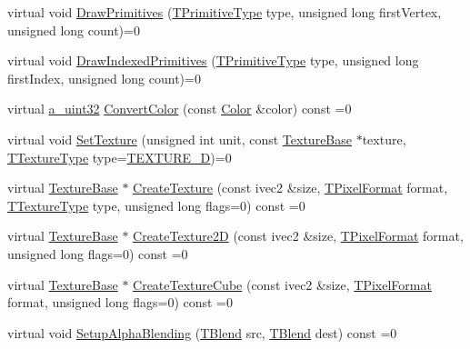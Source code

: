 \begin{DoxyCompactItemize}
virtual void \hyperlink{class_agmd_1_1_driver_a17c73e5ff37f4da7cb16b63f2d1ffa1c}{Draw\+Primitives} (\hyperlink{namespace_agmd_a0e38d0c34891ddd6eef72e1c9e55161c}{T\+Primitive\+Type} type, unsigned long first\+Vertex, unsigned long count)=0
\item 
virtual void \hyperlink{class_agmd_1_1_driver_a602d935335e7601b5fe2b74fe57d3547}{Draw\+Indexed\+Primitives} (\hyperlink{namespace_agmd_a0e38d0c34891ddd6eef72e1c9e55161c}{T\+Primitive\+Type} type, unsigned long first\+Index, unsigned long count)=0
\item 
virtual \hyperlink{_common_defines_8h_a964296f9770051b9e4807b1f180dd416}{a\+\_\+uint32} \hyperlink{class_agmd_1_1_driver_aa9090ef4c1fd4865a708cf990155c780}{Convert\+Color} (const \hyperlink{class_agmd_utilities_1_1_color}{Color} \&color) const =0
\item 
virtual void \hyperlink{class_agmd_1_1_driver_ae64ea2bdfb1bc1b114184d1135b613ff}{Set\+Texture} (unsigned int unit, const \hyperlink{class_agmd_1_1_texture_base}{Texture\+Base} $\ast$texture, \hyperlink{namespace_agmd_a7036bece09449a930cfec410f75e85f4}{T\+Texture\+Type} type=\hyperlink{namespace_agmd_a7036bece09449a930cfec410f75e85f4a337588dae252a993034541482655f94d}{T\+E\+X\+T\+U\+R\+E\+\_\+D})=0
\item 
virtual \hyperlink{class_agmd_1_1_texture_base}{Texture\+Base} $\ast$ \hyperlink{class_agmd_1_1_driver_ae34b1e5edc9a342fd5f1103a1188fce5}{Create\+Texture} (const ivec2 \&size, \hyperlink{namespace_agmd_afc48fd9fa5dccb4c5621c052bfd1a7ec}{T\+Pixel\+Format} format, \hyperlink{namespace_agmd_a7036bece09449a930cfec410f75e85f4}{T\+Texture\+Type} type, unsigned long flags=0) const =0
\item 
virtual \hyperlink{class_agmd_1_1_texture_base}{Texture\+Base} $\ast$ \hyperlink{class_agmd_1_1_driver_a1f3811041b6e476bf5523b51e9decaa4}{Create\+Texture2\+D} (const ivec2 \&size, \hyperlink{namespace_agmd_afc48fd9fa5dccb4c5621c052bfd1a7ec}{T\+Pixel\+Format} format, unsigned long flags=0) const =0
\item 
virtual \hyperlink{class_agmd_1_1_texture_base}{Texture\+Base} $\ast$ \hyperlink{class_agmd_1_1_driver_a86ca6eb2c7dde110c0ad0aaa3be69602}{Create\+Texture\+Cube} (const ivec2 \&size, \hyperlink{namespace_agmd_afc48fd9fa5dccb4c5621c052bfd1a7ec}{T\+Pixel\+Format} format, unsigned long flags=0) const =0
\item 
virtual void \hyperlink{class_agmd_1_1_driver_a9b028ec5fde8ac735723a49df6d69a9d}{Setup\+Alpha\+Blending} (\hyperlink{namespace_agmd_a5c64d61de9c502c3159b9ce5d653f947}{T\+Blend} src, \hyperlink{namespace_agmd_a5c64d61de9c502c3159b9ce5d653f947}{T\+Blend} dest) const =0

\end{DoxyCompactItemize}
